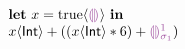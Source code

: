 


  \[\begin{array}{l}
    \ELet{x}{\ECast{\ETrue}{\THole}} \EIn \\
    \EPlus{\ECast{x}{\TInt}}{(\EPlus{(\ETimes{\ECast{x}{\TInt}}{6})}{\EEHole{1}})}
  \end{array}\]

